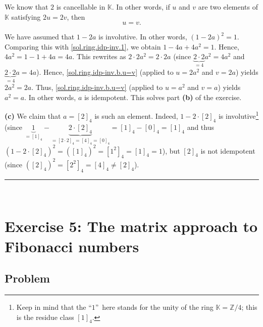 \documentclass[paper=a4, fontsize=12pt]{scrartcl}%
\theoremstyle{plainsl}
\theoremstyle{definition}
\theoremstyle{remark}
\begin{document}
We know that $2$ is cancellable in $\mathbb{K}$. In other words, if $u$ and
$v$ are two elements of $\mathbb{K}$ satisfying $2u=2v$, then
\begin{equation}
u=v. \label{sol.ring.idp-inv.b.u=v}%
\end{equation}


We have assumed that $1-2a$ is involutive. In other words, $\left(
1-2a\right)  ^{2}=1$. Comparing this with \eqref{sol.ring.idp-inv.1}, we
obtain $1-4a+4a^{2}=1$. Hence, $4a^{2}=1-1+4a=4a$. This rewrites as
$2\cdot2a^{2}=2\cdot2a$ (since $\underbrace{2\cdot2}_{=4}a^{2}=4a^{2}$ and
$\underbrace{2\cdot2}_{=4}a=4a$). Hence, \eqref{sol.ring.idp-inv.b.u=v}
(applied to $u=2a^{2}$ and $v=2a$) yields $2a^{2}=2a$. Thus,
\eqref{sol.ring.idp-inv.b.u=v} (applied to $u=a^{2}$ and $v=a$) yields
$a^{2}=a$. In other words, $a$ is idempotent. This solves part \textbf{(b)} of
the exercise.

\bigskip

\textbf{(c)} We claim that $a=\left[  2\right]  _{4}$ is such an element.
Indeed, $1-2\cdot\left[  2\right]  _{4}$ is involutive\footnote{Keep in mind
that the \textquotedblleft$1$\textquotedblright\ here stands for the unity of
the ring $\mathbb{K}=\mathbb{Z}/4$; this is the residue class $\left[
1\right]  _{4}$.} (since $\underbrace{1}_{=\left[  1\right]  _{4}%
}-\underbrace{2\cdot\left[  2\right]  _{4}}_{=\left[  2\cdot2\right]
_{4}=\left[  4\right]  _{4}=\left[  0\right]  _{4}}=\left[  1\right]
_{4}-\left[  0\right]  _{4}=\left[  1\right]  _{4}$ and thus $\left(
1-2\cdot\left[  2\right]  _{4}\right)  ^{2}=\left(  \left[  1\right]
_{4}\right)  ^{2}=\left[  1^{2}\right]  _{4}=\left[  1\right]  _{4}=1$), but
$\left[  2\right]  _{4}$ is not idempotent (since $\left(  \left[  2\right]
_{4}\right)  ^{2}=\left[  2^{2}\right]  _{4}=\left[  4\right]  _{4}\neq\left[
2\right]  _{4}$).

\rule{\linewidth}{0.3pt} \\[0.4cm]

\section{Exercise 5: The matrix approach to Fibonacci numbers}

\subsection{Problem}
\end{document}
